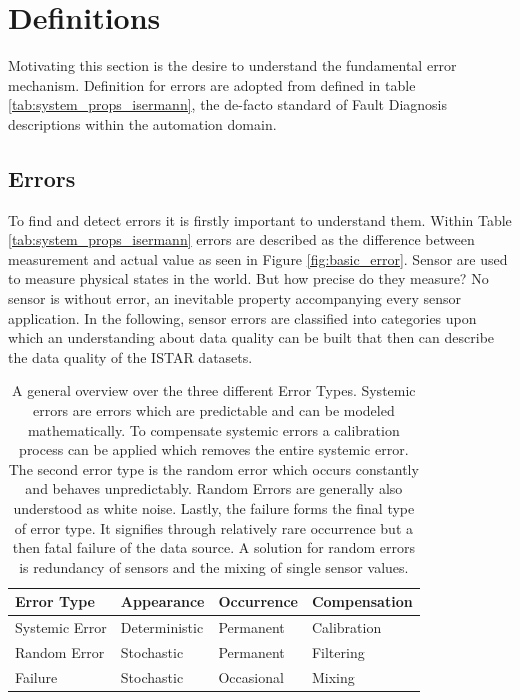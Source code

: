 \newpage


\section{Definitions}
Motivating this section is the desire to understand the fundamental error mechanism. Definition for errors are adopted from \textcite{isermann_fault-diagnosis_2006} defined in table \ref{tab:system_props_isermann}, the de-facto standard of Fault Diagnosis descriptions within the automation domain.

\subsection{Errors}

To find and detect errors it is firstly important to understand them. Within Table \ref{tab:system_props_isermann} errors are described as the difference between measurement and actual value as seen in Figure \ref{fig:basic_error}. Sensor are used to measure physical states in the world. But how precise do they measure? No sensor is without error, an inevitable property accompanying every sensor application. In the following, sensor errors are classified into categories upon which an understanding about data quality can be built that then can describe the data quality of the ISTAR datasets.
\begin{table}[h]
    \centering
    \caption[Error Type Overview]{A general overview over the three different Error Types. Systemic errors are errors which are predictable and can be modeled mathematically. To compensate systemic errors a calibration process can be applied which removes the entire systemic error. The second error type is the random error which occurs constantly and behaves unpredictably. Random Errors are generally also understood as white noise. Lastly, the failure forms the final type of error type. It signifies through relatively rare occurrence but a then fatal failure of the data source. A solution for random errors is redundancy of sensors and the mixing of single sensor values.  \cite{hartmann_flugfuhrung_2022}}
    \begin{tabular}{@{}llll@{}}
        \toprule
        Error Type     & Appearance    & Occurrence & Compensation \\ \midrule
        Systemic Error & Deterministic & Permanent  & Calibration  \\
        Random Error   & Stochastic    & Permanent  & Filtering    \\
        Failure        & Stochastic    & Occasional & Mixing       \\ \bottomrule
    \end{tabular}
    \label{tab:error_types}
\end{table}
\newpage

